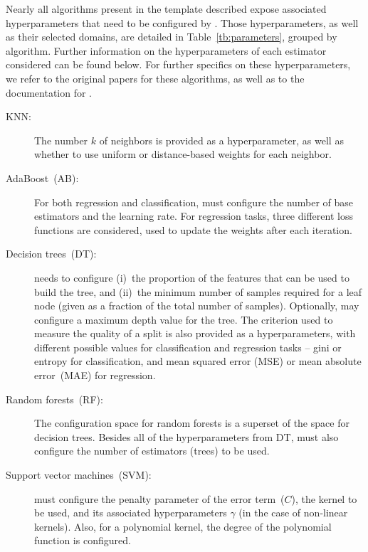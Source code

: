 

Nearly all algorithms present in the template described expose associated hyperparameters that need to be configured by \irace. Those hyperparameters, as well as their selected domains, are detailed in Table~\ref{tb:parameters}, grouped by algorithm. Further information on the hyperparameters of each estimator considered can be found below. For further specifics on these hyperparameters, we refer to the original papers for these algorithms, as well as to the documentation for \sklearn.

\begin{description}
\item[KNN:] The number $k$ of neighbors is provided as a hyperparameter, as well as whether to use uniform or distance-based weights for each neighbor.

\item[AdaBoost~(AB):]
For both regression and classification, \irace must configure the number of base estimators and the learning rate. For regression tasks, three different loss functions are considered, used to update the weights after each iteration.

\item[Decision trees~(DT):]
\irace needs to configure (i)~the proportion of the features that can be used to build the tree, and (ii)~the minimum number of samples required for a leaf node (given as a fraction of the total number of samples). Optionally, \irace may configure a maximum depth value for the tree. The criterion used to measure the quality of a split is also provided as a hyperparameters, with different possible values for classification and regression tasks -- gini or entropy for classification, and mean squared error (MSE) or mean absolute error~(MAE) for regression.

\item[Random forests~(RF):]
The configuration space for random forests is a superset of the space for decision trees. Besides all of the hyperparameters from DT, \irace must also configure the number of estimators (trees) to be used.

\item[Support vector machines~(SVM):]
\irace must configure the penalty parameter of the error term~($C$), the kernel to be used, and its associated hyperparameters $\gamma$ (in the case of non-linear kernels). Also, for a polynomial kernel, the degree of the polynomial function is configured.


\end{description}
